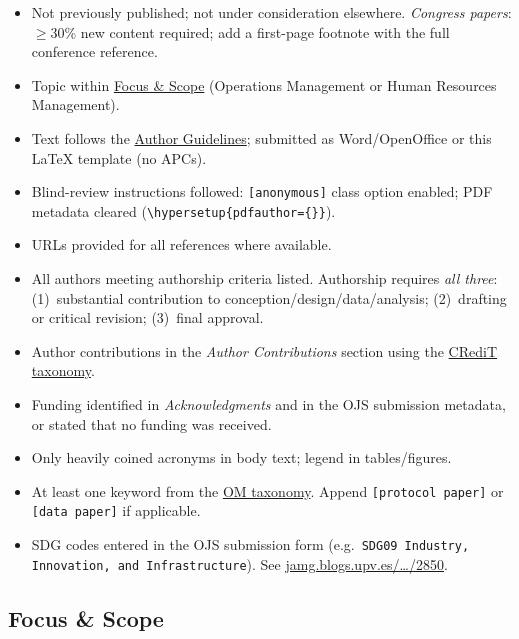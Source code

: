 \documentclass{wpom-upv}
\begin{document}
\begin{itemize}
  \item[$\square$] Not previously published; not under consideration elsewhere.
    \textit{Congress papers}: $\geq$30\% new content required; add a
    first-page footnote with the full conference reference.
  \item[$\square$] Topic within
    \href{https://polipapers.upv.es/index.php/WPOM/focus}{Focus \& Scope}
    (Operations Management or Human Resources Management).
  \item[$\square$] Text follows the
    \href{https://polipapers.upv.es/index.php/WPOM/about/submissions}{Author Guidelines};
    submitted as Word/OpenOffice or this \LaTeX{} template (no APCs).
  \item[$\square$] Blind-review instructions followed: \texttt{[anonymous]}
    class option enabled; PDF metadata cleared
    (\verb|\hypersetup{pdfauthor={}}|).
  \item[$\square$] URLs provided for all references where available.
  \item[$\square$] All authors meeting authorship criteria listed.
    Authorship requires \emph{all three}: (1)~substantial contribution
    to conception/design/data/analysis; (2)~drafting or critical
    revision; (3)~final approval.
  \item[$\square$] Author contributions in the \textit{Author Contributions}
    section using the \href{https://credit.niso.org/}{CRediT taxonomy}.
  \item[$\square$] Funding identified in \textit{Acknowledgments} and in
    the OJS submission metadata, or stated that no funding was received.
  \item[$\square$] Only heavily coined acronyms in body text; legend in
    tables/figures.
  \item[$\square$] At least one keyword from the
    \href{https://taxom.blogs.upv.es/}{OM taxonomy}.
    Append \texttt{[protocol paper]} or \texttt{[data paper]} if applicable.
  \item[$\square$] SDG codes entered in the OJS submission form
    (e.g.\ \texttt{SDG09 Industry, Innovation, and Infrastructure}).
    See \href{https://jamg.blogs.upv.es/2021/05/09/2850/}{jamg.blogs.upv.es/…/2850}.
\end{itemize}

\subsection{Focus \& Scope}
\end{document}
